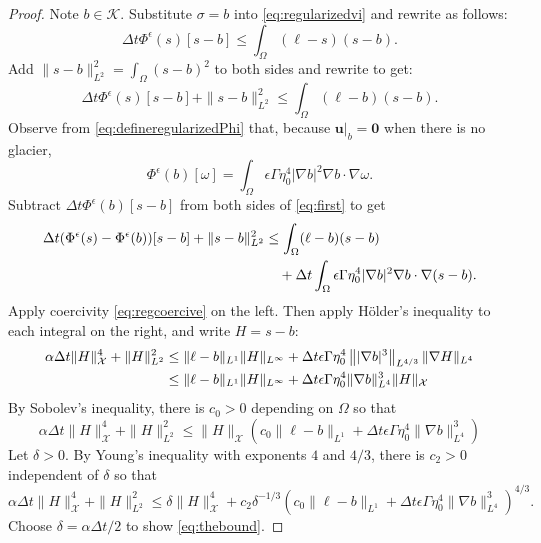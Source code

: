 \documentclass[12pt]{article}
\newcommand{\bu}{\ensuremath{\mathbf{u}}}
\newcommand{\bzero}{\ensuremath{\bm{0}}}
\newcommand{\cK}{\ensuremath{\mathcal{K}}}
\newcommand{\cX}{\ensuremath{\mathcal{X}}}
\newcommand{\grad}{\ensuremath{\nabla}}
\newcommand{\eps}{\ensuremath{\epsilon}}
\begin{document}
\begin{proof}
Note $b\in\cK$.  Substitute $\sigma=b$ into \eqref{eq:regularizedvi} and rewrite as follows:
\begin{equation}
\Delta t \Phi^\eps(s)[s-b] \le \int_\Omega (\ell - s) (s - b).
\end{equation}
Add $\|s-b\|_{L^2}^2=\int_\Omega (s - b)^2$ to both sides and rewrite to get:
\begin{equation}
\Delta t \Phi^\eps(s)[s-b] + \|s-b\|_{L^2}^2 \le \int_\Omega (\ell - b) (s - b). \label{eq:first}
\end{equation}
Observe from \eqref{eq:defineregularizedPhi} that, because $\bu|_b=\bzero$ when there is no glacier,
\begin{equation}
\Phi^\eps(b)[\omega] = \int_\Omega \eps \Gamma \eta_0^4 |\grad b|^2 \grad b \cdot \grad\omega.
\end{equation}
Subtract $\Delta t\Phi^\eps(b)[s-b]$ from both sides of \eqref{eq:first} to get
\begin{align}
\Delta t (\Phi^\eps(s) - \Phi^\eps(b))[s-b] + \|s-b\|_{L^2}^2 &\le \int_\Omega (\ell - b) (s - b) \\
 &\quad + \Delta t \int_\Omega \eps \Gamma \eta_0^4 |\grad b|^2 \grad b \cdot \grad(s-b). \notag
\end{align}
Apply coercivity \eqref{eq:regcoercive} on the left.  Then apply H\"older's inequality to each integral on the right, and write $H=s-b$:
\begin{align}
\alpha \Delta t \|H\|_{\cX}^4 + \|H\|_{L^2}^2 &\le \|\ell - b\|_{L^1} \|H\|_{L^\infty} + \Delta t \eps \Gamma \eta_0^4 \left\||\grad b|^3\right\|_{L^{4/3}} \|\grad H\|_{L^4} \\
 &\le \|\ell - b\|_{L^1} \|H\|_{L^\infty} + \Delta t \eps \Gamma \eta_0^4 \|\grad b\|_{L^4}^3 \|H\|_{\cX} \notag
\end{align}
By Sobolev's inequality, there is $c_0>0$ depending on $\Omega$ so that
\begin{equation}
\alpha \Delta t \|H\|_{\cX}^4 + \|H\|_{L^2}^2 \le \|H\|_{\cX} \left(c_0\|\ell - b\|_{L^1}  + \Delta t \eps \Gamma \eta_0^4 \|\grad b\|_{L^4}^3\right)
\end{equation}
Let $\delta>0$.  By Young's inequality \cite{Evans2010} with exponents $4$ and $4/3$, there is $c_2>0$ independent of $\delta$ so that
\begin{equation}
\alpha \Delta t \|H\|_{\cX}^4 + \|H\|_{L^2}^2 \le \delta \|H\|_{\cX}^4 + c_2 \delta^{-1/3} \left(c_0\|\ell - b\|_{L^1}  + \Delta t \eps \Gamma \eta_0^4 \|\grad b\|_{L^4}^3\right)^{4/3}.
\end{equation}
Choose $\delta = \alpha \Delta t/2$ to show \eqref{eq:thebound}.
\end{proof}
\end{document}
